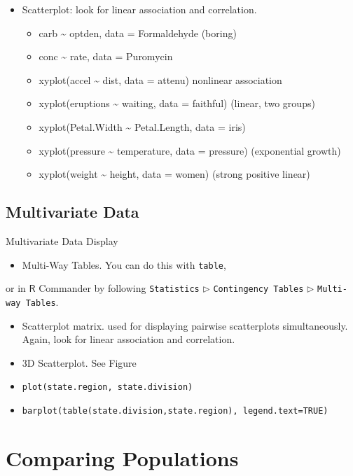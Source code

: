 \documentclass[captions=tableheading]{scrbook}
\begin{document}
\begin{itemize}
\item Scatterplot: look for linear association and correlation.
\begin{itemize}
\item carb \~{} optden, data = Formaldehyde (boring)
\item conc \~{} rate, data = Puromycin
\item xyplot(accel \~{} dist, data = attenu) nonlinear association
\item xyplot(eruptions \~{} waiting, data = faithful) (linear, two groups)
\item xyplot(Petal.Width \~{} Petal.Length, data = iris)
\item xyplot(pressure \~{} temperature, data = pressure) (exponential growth)
\item xyplot(weight \~{} height, data = women) (strong positive linear)
\end{itemize}
\end{itemize}
\subsection{Multivariate Data}
\label{sec-2-5-2}
\label{sub:Multivariate-Data}


Multivariate Data Display

\begin{itemize}
\item Multi-Way Tables. You can do this with \texttt{table},
\end{itemize}
or in \(\mathsf{R}\) Commander by following \texttt{Statistics} \(\triangleright\) \texttt{Contingency Tables} \(\triangleright\) \texttt{Multi-way Tables}.
\begin{itemize}
\item Scatterplot matrix. used for displaying pairwise scatterplots simultaneously. Again, look for linear association and correlation.
\item 3D Scatterplot. See Figure \pageref{fig:3D-scatterplot-trees}
\item \texttt{plot(state.region, state.division)}
\item \texttt{barplot(table(state.division,state.region), legend.text=TRUE)}
\end{itemize}
\section{Comparing Populations}
\label{sec-2-6}
\label{sec:Comparing-Data-Sets}
\end{document}
